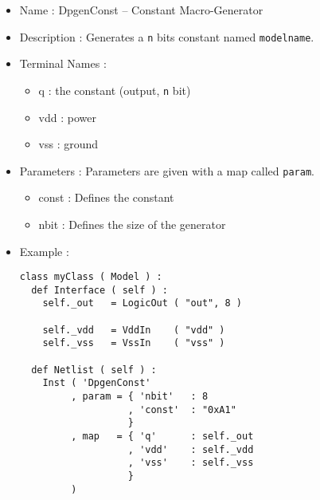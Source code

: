 \begin{itemize}
    \item Name : DpgenConst -- Constant Macro-Generator
    \item Description : Generates a \verb-n- bits constant named \verb-modelname-.
    \item Terminal Names :
    \begin{itemize}
        \item q : the constant (output, \verb-n- bit)
        \item vdd : power
        \item vss : ground
    \end{itemize}
    \item Parameters : Parameters are given with a map called \verb-param-.
    \begin{itemize}
        \item const : Defines the constant
        \item nbit : Defines the size of the generator
    \end{itemize}
    \item Example :
\begin{verbatim}
class myClass ( Model ) :
  def Interface ( self ) :
    self._out   = LogicOut ( "out", 8 )

    self._vdd   = VddIn    ( "vdd" )
    self._vss   = VssIn    ( "vss" )
    
  def Netlist ( self ) :
    Inst ( 'DpgenConst'
         , param = { 'nbit'   : 8
                   , 'const'  : "0xA1"
                   }
         , map   = { 'q'      : self._out
                   , 'vdd'    : self._vdd
                   , 'vss'    : self._vss
                   }
         )
\end{verbatim}
\end{itemize}
